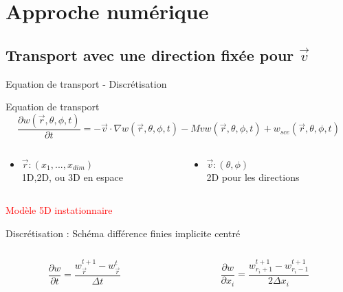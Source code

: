 \normalsize

\section{Approche numérique}

\subsection{Transport avec une direction fixée pour $\vec{v}$}
\begin{frame}{Equation de transport - Discrétisation}

  \begin{block}{Equation de transport}
    \begin{equation*}
      \frac{\partial w(\vec{r}, \theta, \phi, t)}{\partial t} = -\vec{v} \cdot \nabla w(\vec{r}, \theta, \phi, t) - M v w(\vec{r}, \theta, \phi, t) + 
      w_{sce}(\vec{r}, \theta, \phi, t)
    \end{equation*}
    
    \begin{columns}[c]
      \begin{column}{5cm}
        \begin{itemize}
        \item $\vec{r} : (x_1,...,x_{dim})$ \\
          1D,2D, ou 3D en espace
        \end{itemize}
      \end{column}
      \begin{column}{5cm}
        \begin{itemize}
        \item $\vec{v} : (\theta, \phi)$ \\
          2D pour les directions
        \end{itemize}
      \end{column}
    \end{columns}

    \begin{center}
      \textcolor{red}{Modèle 5D instationnaire}
    \end{center}
  \end{block}

  \begin{alertblock}{Discrétisation : Schéma différence finies implicite centré}
    \begin{columns}[c]
      \begin{column}{6cm}
        \begin{equation*}
          \frac{\partial w}{\partial t} = \frac{w^{t+1}_{\vec{r}} - w^t_{\vec{r}}}{\Delta t}
        \end{equation*}
      \end{column}
      \begin{column}{6cm}
        \begin{equation*}
          \frac{\partial w}{\partial x_i} = \frac{w^{t+1}_{r_i + 1} - w^{t+1}_{r_i - 1}}{2\Delta x_i}
        \end{equation*}
      \end{column}
    \end{columns} 


\end{alertblock}
\end{frame}
